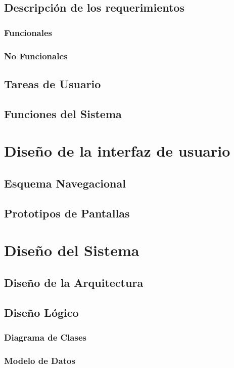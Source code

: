 \documentclass[12pt]{article}
\begin{document}
\subsection{Descripción de los requerimientos}
\subsubsection{Funcionales}
\subsubsection{No Funcionales}
\subsection{Tareas de Usuario}
\subsection{Funciones del Sistema}

\newpage
\section{Dise\~no de la interfaz de usuario}
\subsection{Esquema Navegacional}
\subsection{Prototipos de Pantallas}

\newpage
\section{Dise\~no del Sistema}
\subsection{Dise\~no de la Arquitectura}
\subsection{Dise\~no Lógico}
\subsubsection{Diagrama de Clases}
\subsubsection{Modelo de Datos}
\end{document}
